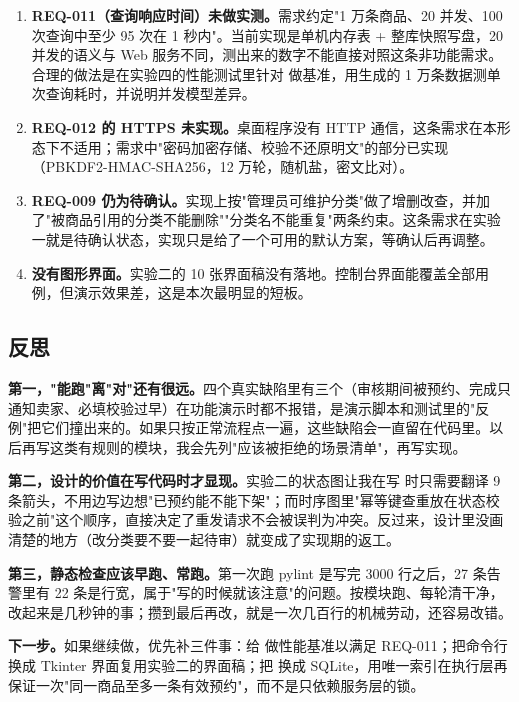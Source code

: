 \begin{enumerate}[leftmargin=1.6em,itemsep=2pt,topsep=3pt]
\item \textbf{REQ-011（查询响应时间）未做实测。}需求约定"1 万条商品、20 并发、100 次查询中至少 95 次在 1 秒内"。当前实现是单机内存表 + 整库快照写盘，20 并发的语义与 Web 服务不同，测出来的数字不能直接对照这条非功能需求。合理的做法是在实验四的性能测试里针对  做基准，用生成的 1 万条数据测单次查询耗时，并说明并发模型差异。
\item \textbf{REQ-012 的 HTTPS 未实现。}桌面程序没有 HTTP 通信，这条需求在本形态下不适用；需求中"密码加密存储、校验不还原明文"的部分已实现（PBKDF2-HMAC-SHA256，12 万轮，随机盐，密文比对）。
\item \textbf{REQ-009 仍为待确认。}实现上按"管理员可维护分类"做了增删改查，并加了"被商品引用的分类不能删除""分类名不能重复"两条约束。这条需求在实验一就是待确认状态，实现只是给了一个可用的默认方案，等确认后再调整。
\item \textbf{没有图形界面。}实验二的 10 张界面稿没有落地。控制台界面能覆盖全部用例，但演示效果差，这是本次最明显的短板。
\end{enumerate}

\subsection{反思}

\textbf{第一，"能跑"离"对"还有很远。}四个真实缺陷里有三个（审核期间被预约、完成只通知卖家、必填校验过早）在功能演示时都不报错，是演示脚本和测试里的"反例"把它们撞出来的。如果只按正常流程点一遍，这些缺陷会一直留在代码里。以后再写这类有规则的模块，我会先列"应该被拒绝的场景清单"，再写实现。

\textbf{第二，设计的价值在写代码时才显现。}实验二的状态图让我在写  时只需要翻译 9 条箭头，不用边写边想"已预约能不能下架"；而时序图里"幂等键查重放在状态校验之前"这个顺序，直接决定了重发请求不会被误判为冲突。反过来，设计里没画清楚的地方（改分类要不要一起待审）就变成了实现期的返工。

\textbf{第三，静态检查应该早跑、常跑。}第一次跑 pylint 是写完 3000 行之后，27 条告警里有 22 条是行宽，属于"写的时候就该注意"的问题。按模块跑、每轮清干净，改起来是几秒钟的事；攒到最后再改，就是一次几百行的机械劳动，还容易改错。

\textbf{下一步。}如果继续做，优先补三件事：给  做性能基准以满足 REQ-011；把命令行换成 Tkinter 界面复用实验二的界面稿；把  换成 SQLite，用唯一索引在执行层再保证一次"同一商品至多一条有效预约"，而不是只依赖服务层的锁。
